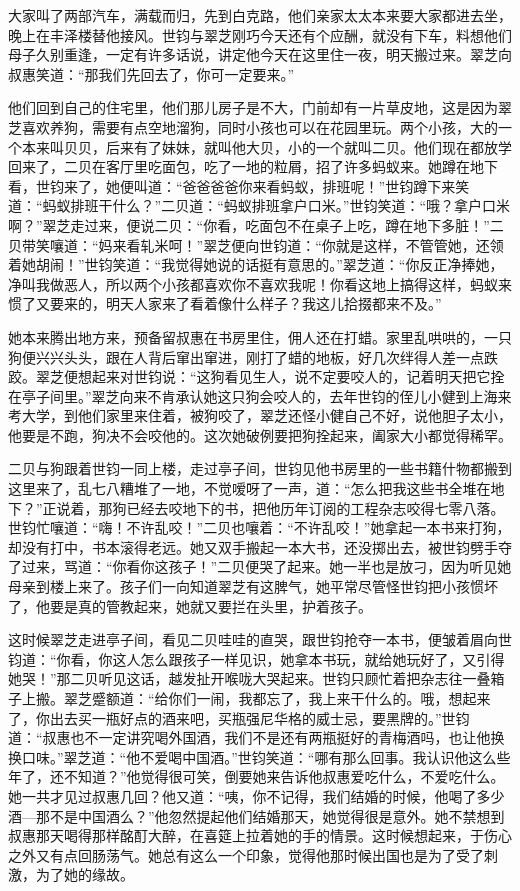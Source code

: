 \par 大家叫了两部汽车，满载而归，先到白克路，他们亲家太太本来要大家都进去坐，晚上在丰泽楼替他接风。世钧与翠芝刚巧今天还有个应酬，就没有下车，料想他们母子久别重逢，一定有许多话说，讲定他今天在这里住一夜，明天搬过来。翠芝向叔惠笑道：“那我们先回去了，你可一定要来。”
\par 他们回到自己的住宅里，他们那儿房子是不大，门前却有一片草皮地，这是因为翠芝喜欢养狗，需要有点空地溜狗，同时小孩也可以在花园里玩。两个小孩，大的一个本来叫贝贝，后来有了妹妹，就叫他大贝，小的一个就叫二贝。他们现在都放学回来了，二贝在客厅里吃面包，吃了一地的粒屑，招了许多蚂蚁来。她蹲在地下看，世钧来了，她便叫道：“爸爸爸爸你来看蚂蚁，排班呢！”世钧蹲下来笑道：“蚂蚁排班干什么？”二贝道：“蚂蚁排班拿户口米。”世钧笑道：“哦？拿户口米啊？”翠芝走过来，便说二贝：“你看，吃面包不在桌子上吃，蹲在地下多脏！”二贝带笑嚷道：“妈来看轧米呵！”翠芝便向世钧道：“你就是这样，不管管她，还领着她胡闹！”世钧笑道：“我觉得她说的话挺有意思的。”翠芝道：“你反正净捧她，净叫我做恶人，所以两个小孩都喜欢你不喜欢我呢！你看这地上搞得这样，蚂蚁来惯了又要来的，明天人家来了看着像什么样子？我这儿拾掇都来不及。”
\par 她本来腾出地方来，预备留叔惠在书房里住，佣人还在打蜡。家里乱哄哄的，一只狗便兴兴头头，跟在人背后窜出窜进，刚打了蜡的地板，好几次绊得人差一点跌跤。翠芝便想起来对世钧说：“这狗看见生人，说不定要咬人的，记着明天把它拴在亭子间里。”翠芝向来不肯承认她这只狗会咬人的，去年世钧的侄儿小健到上海来考大学，到他们家里来住着，被狗咬了，翠芝还怪小健自己不好，说他胆子太小，他要是不跑，狗决不会咬他的。这次她破例要把狗拴起来，阖家大小都觉得稀罕。
\par 二贝与狗跟着世钧一同上楼，走过亭子间，世钧见他书房里的一些书籍什物都搬到这里来了，乱七八糟堆了一地，不觉嗳呀了一声，道：“怎么把我这些书全堆在地下？”正说着，那狗已经去咬地下的书，把他历年订阅的工程杂志咬得七零八落。世钧忙嚷道：“嗨！不许乱咬！”二贝也嚷着：“不许乱咬！”她拿起一本书来打狗，却没有打中，书本滚得老远。她又双手搬起一本大书，还没掷出去，被世钧劈手夺了过来，骂道：“你看你这孩子！”二贝便哭了起来。她一半也是放刁，因为听见她母亲到楼上来了。孩子们一向知道翠芝有这脾气，她平常尽管怪世钧把小孩惯坏了，他要是真的管教起来，她就又要拦在头里，护着孩子。
\par 这时候翠芝走进亭子间，看见二贝哇哇的直哭，跟世钧抢夺一本书，便皱着眉向世钧道：“你看，你这人怎么跟孩子一样见识，她拿本书玩，就给她玩好了，又引得她哭！”那二贝听见这话，越发扯开喉咙大哭起来。世钧只顾忙着把杂志往一叠箱子上搬。翠芝蹙额道：“给你们一闹，我都忘了，我上来干什么的。哦，想起来了，你出去买一瓶好点的酒来吧，买瓶强尼华格的威士忌，要黑牌的。”世钧道：“叔惠也不一定讲究喝外国酒，我们不是还有两瓶挺好的青梅酒吗，也让他换换口味。”翠芝道：“他不爱喝中国酒。”世钧笑道：“哪有那么回事。我认识他这么些年了，还不知道？”他觉得很可笑，倒要她来告诉他叔惠爱吃什么，不爱吃什么。她一共才见过叔惠几回？他又道：“咦，你不记得，我们结婚的时候，他喝了多少酒—那不是中国酒么？”他忽然提起他们结婚那天，她觉得很是意外。她不禁想到叔惠那天喝得那样酩酊大醉，在喜筵上拉着她的手的情景。这时候想起来，于伤心之外又有点回肠荡气。她总有这么一个印象，觉得他那时候出国也是为了受了刺激，为了她的缘故。
